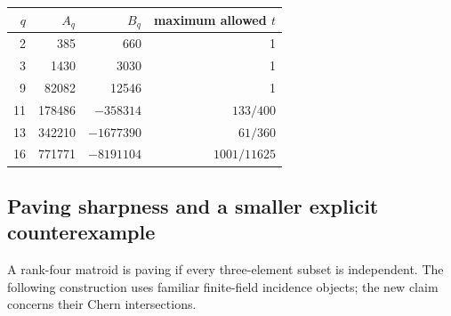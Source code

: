 \documentclass[12pt]{amsart}
\theoremstyle{definition}
\theoremstyle{remark}
\numberwithin{equation}{section}
\begin{document}
\begin{center}\small
\begin{tabular}{rrrr}
\toprule
$q$&$A_q$&$B_q$&maximum allowed $t$\\\midrule
2&385&660&1\\
3&1430&3030&1\\
9&82082&12546&1\\
11&178486&$-358314$&$133/400$\\
13&342210&$-1677390$&$61/360$\\
16&771771&$-8191104$&$1001/11625$\\\bottomrule
\end{tabular}
\end{center}

\subsection{Paving sharpness and a smaller explicit counterexample}
A rank-four matroid is paving if every three-element subset is independent. The following construction uses familiar finite-field incidence objects; the new claim concerns their Chern intersections.
\end{document}
